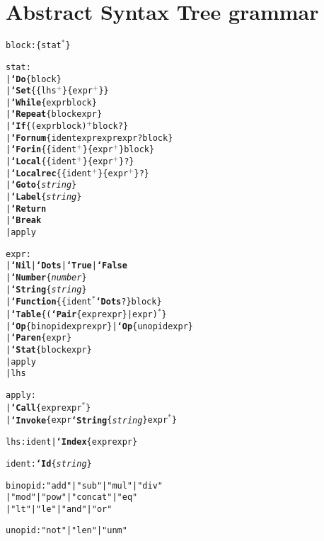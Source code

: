 \def\T#1{{\bf`#1}}
\def\L#1{\{#1\}}
\def\P#1{{\it #1}}
\def\C#1{[\hspace{-.4em}[#1]\hspace{-.4em}]}
\def\V#1{{\it #1}}
\def\plus{\ensuremath{{}^{+}}}
\def\star{\ensuremath{{}^{*}}}
\def\TRANS{\ensuremath{\Longrightarrow}}
% 

\section{Abstract Syntax Tree grammar}

\begin{alltt}

block: \L{ stat\star }

stat:
| \T{Do}\L{ block }
| \T{Set}\L{ \L{lhs\plus} \L{expr\plus} }
| \T{While}\L{ expr block }
| \T{Repeat}\L{ block expr }
| \T{If}\L{ (expr block)\plus block? }
| \T{Fornum}\L{ ident expr expr expr? block }
| \T{Forin}\L{ \L{ident\plus} \L{expr\plus} block }
| \T{Local}\L{ \L{ident\plus} \L{expr\plus}? }
| \T{Localrec}\L{ \L{ident\plus} \L{expr\plus}? }
| \T{Goto}\L{\P{string}}
| \T{Label}\L{\P{string}}
| \T{Return}
| \T{Break}
| apply

expr:
| \T{Nil} | \T{Dots} | \T{True} | \T{False}
| \T{Number}\L{ \P{number} }
| \T{String}\L{ \P{string} }
| \T{Function}\L{ \L{ ident\star \T{Dots}? } block } 
| \T{Table}\L{ ( \T{Pair}\L{ expr expr } | expr )\star }
| \T{Op}\L{ binopid expr expr } | \T{Op}\L{ unopid expr }
| \T{Paren}\L{ expr }
| \T{Stat}\L{ block expr }
| apply
| lhs

apply:
| \T{Call}\L{ expr expr\star }
| \T{Invoke}\L{ expr \T{String}\L{ \P{string} } expr\star }

lhs: ident | \T{Index}\L{ expr expr }

ident: \T{Id}\L{ \P{string} }

binopid: "add" | "sub" | "mul"    | "div"
       | "mod" | "pow" | "concat" | "eq"
       | "lt"  | "le"  | "and"    | "or"

unopid:  "not" | "len" | "unm"
\end{alltt}
  


